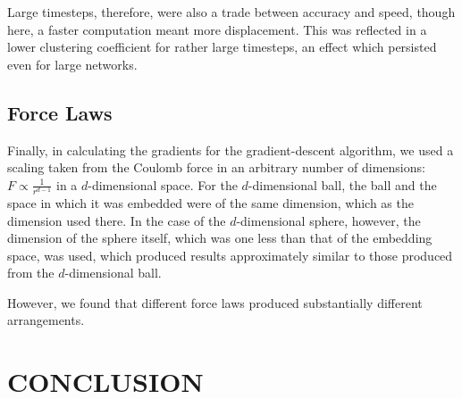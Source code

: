 \documentclass[aps,pre,reprint,superscriptaddress,amsmath,amssymb]{revtex4-1}
\begin{document}
Large timesteps, therefore, were also a trade between accuracy and speed, though here, a faster computation meant more displacement.  
This was reflected in a lower clustering coefficient for rather large timesteps, an effect which persisted even for large networks.

\subsection{Force Laws}
Finally, in calculating the gradients for the gradient-descent algorithm, we used a scaling taken from the Coulomb force in an arbitrary number of dimensions: $F \propto \frac{1}{r^{d-1}}$ in a $d$-dimensional space.  
For the $d$-dimensional ball, the ball and the space in which it was embedded were of the same dimension, which as the dimension used there.  
In the case of the $d$-dimensional sphere, however, the dimension of the sphere itself, which was one less than that of the embedding space, was used, which produced results approximately similar to those produced from the $d$-dimensional ball.

However, we found that different force laws produced substantially different arrangements.  %

\section{CONCLUSION}


\end{document}
